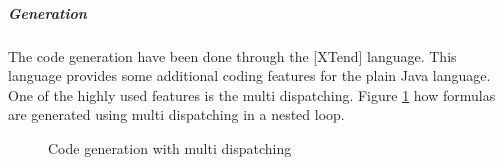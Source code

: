 \subparagraph{Generation}
The code generation have been done through the [XTend] language.
This language provides some additional coding features for the plain Java language.
One of the highly used features is the multi dispatching.
Figure \ref{fig:multidispatching} how formulas are generated using multi dispatching in a nested loop.

\begin{figure}
\begin{center}

\end{center}
\caption{Code generation with multi dispatching}
\label{fig:multidispatching}
\end{figure}
